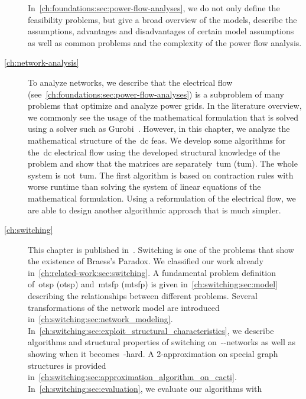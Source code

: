 \begin{description}
    In~\cref{ch:foundations:sec:power-flow-analyses}, we do not only define the
    feasibility problems, but give a broad overview of the models, describe the
    assumptions, advantages and disadvantages of certain model assumptions as
    well as common problems and the complexity of the power flow analysis. 
    \item[\cref{ch:network-analysis}] To analyze networks, we describe
    that the electrical flow (see~\cref{ch:foundations:sec:power-flow-analyses})
    is a subproblem of many problems that optimize and analyze power grids. In
    the literature overview, we commonly see the usage of the mathematical
    formulation that is solved using a solver such as Gurobi~\parencite{gurobi}.
    However, in this chapter, we analyze the mathematical structure of
    the~\acrlong{dc} \acrlong{feas}. We develop some algorithms for the~\gls{dc}
    electrical flow using the developed structural knowledge of the problem and
    show that the matrices are separately~\acrlong{tum} (\gls{tum}). The whole
    system is not~\gls{tum}. The first algorithm is based on contraction rules
    with worse runtime than solving the system of linear equations of the
    mathematical formulation. Using a reformulation of the electrical flow, we
    are able to design another algorithmic approach that is much simpler.
    \item[\cref{ch:switching}] This chapter is published in~\parencite{Gra18}.
    Switching is one of the problems that show the existence of Braess's
    Paradox. We classified our work already
    in~\cref{ch:related-work:sec:switching}.
    A fundamental problem definition of~\acrlong{otsp} (\gls{otsp})
    and~\acrlong{mtsfp} (\gls{mtsfp}) is given in~\cref{ch:switching:sec:model}
    describing the relationships between different problems. Several
    transformations of the network model are introduced
    in~\cref{ch:switching:sec:network_modeling}.
    In~\cref{ch:switching:sec:exploit_structural_characteristics}, we describe
    algorithms and structural properties of switching
    on~\source-\sink-networks as well as showing when it becomes~\NP-hard. A
    2-approximation on special graph structures is provided
    in~\cref{ch:switching:sec:approximation_algorithm_on_cacti}.
    In~\cref{ch:switching:sec:evaluation}, we evaluate our algorithms with

\end{description}
